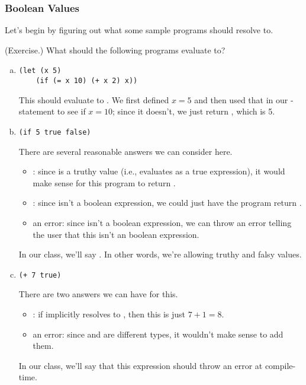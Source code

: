 \documentclass[letterpaper]{article}
\begin{document}
\subsubsection{Boolean Values}
Let's begin by figuring out what some sample programs should resolve to.
\begin{mdframed}
    (Exercise.) What should the following programs evaluate to? 
    \begin{enumerate}[a.]
        \item \begin{verbatim}
(let (x 5)
    (if (= x 10) (+ x 2) x))\end{verbatim}

        \begin{mdframed}
            This should evaluate to . We first defined $x = 5$ and then used that in our -statement to see if $x = 10$; since it doesn't, we just return , which is 5.  
        \end{mdframed}


        \item \begin{verbatim}
(if 5 true false)\end{verbatim}

        \begin{mdframed}
            There are several reasonable answers we can consider here. 
            \begin{itemize}
                \item {}: since  is a truthy value (i.e., evaluates as a true expression), it would make sense for this program to return .
                \item {}: since  isn't a boolean expression, we could just have the program return .
                \item an error: since  isn't a boolean expression, we can throw an error telling the user that this isn't an boolean expression. 
            \end{itemize}
            In our class, we'll say . In other words, we're allowing truthy and falsy values.
        \end{mdframed}


        \item \begin{verbatim}
(+ 7 true)\end{verbatim}

        \begin{mdframed}
            There are two answers we can have for this. 
            \begin{itemize}
                \item {}: if  implicitly resolves to , then this is just $7 + 1 = 8$.
                \item an error: since  and  are different types, it wouldn't make sense to add them. 
            \end{itemize}
            In our class, we'll say that this expression should throw an error at compile-time.
        \end{mdframed}


\end{enumerate}
\end{mdframed}
\end{document}
